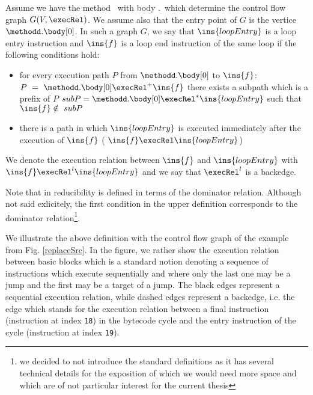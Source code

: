 \begin{defLoop}
\label{defLoop}
Assume we have the method \methodd \ with body \methodd.\body \ which determine the control flow graph $G(V, \execRel) $.  We assume also 
that the entry point of $G$ is the vertice  $\methodd.\body[0]$.
 In such a graph $G$, we say that $\ins{loopEntry}$ is a loop entry instruction and $\ins{f}$ is a loop end instruction
 of the same loop if the following conditions hold:
\begin{itemize}
\item for every execution path $P$ from $\methodd.\body[0]$ to  $\ins{f}$:   $P~=~\methodd.\body[0] \execRel^{+} \ins{f}$
 there exists a subpath which is a prefix of $P$  $subP = \methodd.\body[0] \execRel^{*} \ins{loopEntry}$ such that $\ins{f} \notin  \ subP  $
\item there is a path in which $\ins{loopEntry}$  is executed immediately after the execution of $\ins{f}$ ( $\ins{f} \execRel \ins{loopEntry}$)
\end{itemize}
We denote the execution relation between $\ins{f}$ and  $\ins{loopEntry}$ with \\
$\ins{f} \execRel^l \ins{loopEntry}$ and we say that $  \execRel^l $  is a backedge. 
\end{defLoop}
Note  that  in  \cite{ARUCom1986}  reducibility is defined in terms of the dominator relation. 
Although  not said exlicitely, the first condition in the upper definition corresponds to the dominator relation\footnote{we decided to not introduce the standard
definitions as it has several technical details for the exposition of which we would need more space and which are of not particular interest for the current thesis}.

We illustrate the above definition with the control flow graph of the example from Fig. \ref{replaceSrc}.%
In the figure, we rather show the execution relation between basic blocks which is a standard notion denoting a sequence of instructions which execute sequentially
and  where only the last one may be a jump and the first may be a target of a jump. 
The black edges represent a sequential execution relation, while dashed edges represent a backedge, i.e. the edge which stands for the execution
relation between a final instruction (instruction at index \texttt{18}) in the bytecode cycle and the entry instruction of the cycle (instruction at index \texttt{19}).  

